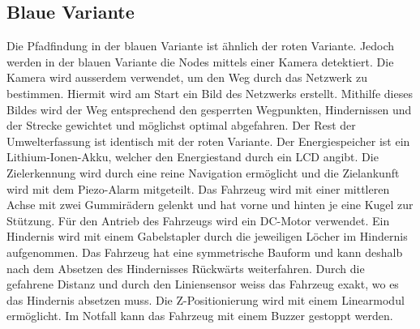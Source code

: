\documentclass[main.tex]{subfiles} %
\begin{document}
\subsection{Blaue Variante}
Die Pfadfindung in der blauen Variante ist ähnlich der roten Variante. Jedoch werden in der blauen Variante die Nodes mittels einer Kamera detektiert. Die Kamera wird ausserdem verwendet, um den Weg durch das Netzwerk zu bestimmen. Hiermit wird am Start ein Bild des Netzwerks erstellt. Mithilfe dieses Bildes wird der Weg entsprechend den gesperrten Wegpunkten, Hindernissen und der  Strecke gewichtet und möglichst optimal abgefahren. Der Rest der Umwelterfassung ist identisch mit der roten Variante.\newline
Der Energiespeicher ist ein Lithium-Ionen-Akku, welcher den Energiestand durch ein LCD angibt. Die Zielerkennung wird durch eine reine Navigation ermöglicht und die Zielankunft wird mit dem Piezo-Alarm mitgeteilt.\newline
Das Fahrzeug wird mit einer mittleren Achse mit zwei Gummirädern gelenkt und hat vorne und hinten je eine Kugel zur Stützung. Für den Antrieb des Fahrzeugs wird ein DC-Motor verwendet. Ein Hindernis wird mit einem Gabelstapler durch die jeweiligen Löcher im Hindernis aufgenommen. Das Fahrzeug hat eine symmetrische Bauform und kann deshalb nach dem Absetzen des Hindernisses Rückwärts weiterfahren. Durch die gefahrene Distanz und durch den Liniensensor weiss das Fahrzeug exakt, wo es das Hindernis absetzen muss. Die Z-Positionierung wird mit einem Linearmodul ermöglicht. Im Notfall kann das Fahrzeug mit einem Buzzer gestoppt werden.
\end{document}
